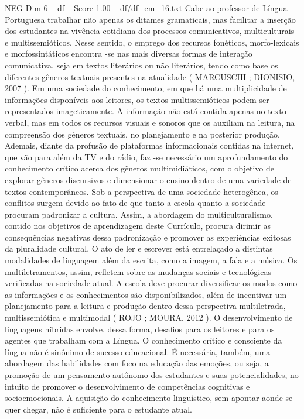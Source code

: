 \begin{textsample}{NEG Dim 6 – df – Score 1.00 – df/df\_em\_16.txt}
Cabe ao professor de Língua Portuguesa trabalhar não apenas os ditames gramaticais, mas facilitar a inserção dos estudantes na vivência cotidiana dos processos comunicativos, multiculturais e multissemióticos.
Nesse sentido, o emprego dos recursos fonéticos, morfo-lexicais e morfossintáticos encontra -se nas mais diversas formas de interação comunicativa, seja em textos literários ou não literários, tendo como base os diferentes gêneros textuais presentes na atualidade ( MARCUSCHI ; DIONISIO, 2007 ).
Em uma sociedade do conhecimento, em que há uma multiplicidade de informações disponíveis aos leitores, os textos multissemióticos podem ser representados imageticamente.
A informação não está contida apenas no texto verbal, mas em todos os recursos visuais e sonoros que os auxiliam na leitura, na compreensão dos gêneros textuais, no planejamento e na posterior produção.
Ademais, diante da profusão de plataformas informacionais contidas na internet, que vão para além da TV e do rádio, faz -se necessário um aprofundamento do conhecimento crítico acerca dos gêneros multimidiáticos, com o objetivo de explorar gêneros discursivos e dimensionar o ensino dentro de uma variedade de textos contemporâneos.
Sob a perspectiva de uma sociedade heterogênea, os conflitos surgem devido ao fato de que tanto a escola quanto a sociedade procuram padronizar a cultura.
Assim, a abordagem do multiculturalismo, contido nos objetivos de aprendizagem deste Currículo, procura dirimir as consequências negativas dessa padronização e promover as experiências exitosas da pluralidade cultural.
O ato de ler e escrever está entrelaçado a distintas modalidades de linguagem além da escrita, como a imagem, a fala e a música.
Os multiletramentos, assim, refletem sobre as mudanças sociais e tecnológicas verificadas na sociedade atual.
A escola deve procurar diversificar os modos como as informações e os conhecimentos são disponibilizados, além de incentivar um planejamento para a leitura e produção dentro dessa perspectiva multiletrada, multissemiótica e multimodal ( ROJO ; MOURA, 2012 ).
O desenvolvimento de linguagens híbridas envolve, dessa forma, desafios para os leitores e para os agentes que trabalham com a Língua.
O conhecimento crítico e consciente da língua não é sinônimo de sucesso educacional.
É necessária, também, uma abordagem das habilidades com foco na educação das emoções, ou seja, a promoção de um pensamento autônomo dos estudantes e suas potencialidades, no intuito de promover o desenvolvimento de competências cognitivas e socioemocionais.
A aquisição do conhecimento linguístico, sem apontar aonde se quer chegar, não é suficiente para o estudante atual.

\end{textsample}
